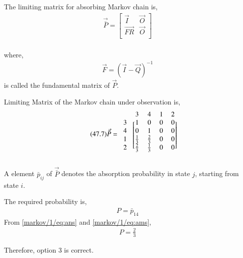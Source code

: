 \begin{definition}
The limiting matrix for absorbing Markov chain is,
\begin{align}
\tag{47.5}
\label{markov/1/eq:pbar}
    \vec{\bar P}=\begin{bmatrix}
    \vec{I} & \vec{O}\\
    \vec{FR} & \vec{O}\\
    \end{bmatrix}
\end{align}
\\where,
\begin{align}
\tag{47.6}
\label{markov/1/eq:f}
    \vec{F}=(\vec{I}-\vec{Q})^{-1}
\end{align}
is called the fundamental matrix of $\vec{P}$. \\
\end{definition}
\begin{corollary}
Limiting Matrix of the Markov chain under observation is, 
\begin{align} 
\tag{47.7}
\label{markov/1/eq:ans}
    \vec{\bar P}=\begin{blockarray}{ccccc}
&3 &4 &1 &2\\
\begin{block}{c[cccc]}
    3 & 1 & 0 & 0 & 0  \\
    4 & 0 & 1 & 0 & 0  \\
    1 & \frac{1}{3} & \frac{2}{3} & 0 & 0 \\
    2 & \frac{2}{3} & \frac{1}{3} & 0 & 0 \\
   \end{block}
\end{blockarray}
\end{align}
\end{corollary}
\begin{definition}
A element $\bar p_{ij}$ of $\vec{\bar P}$ denotes the absorption probability in state $j$, starting from state $i$.
\end{definition}
\begin{corollary}
The required probability is,
\begin{align}
\tag{47.8}
\label{markov/1/eq:ams}
P =\bar p_{14}
\end{align}
From \eqref{markov/1/eq:ans} and \eqref{markov/1/eq:ams},
\begin{align}
\tag{47.9}
P=\frac{2}{3}
\end{align}
\end{corollary}
Therefore, option 3 is correct.